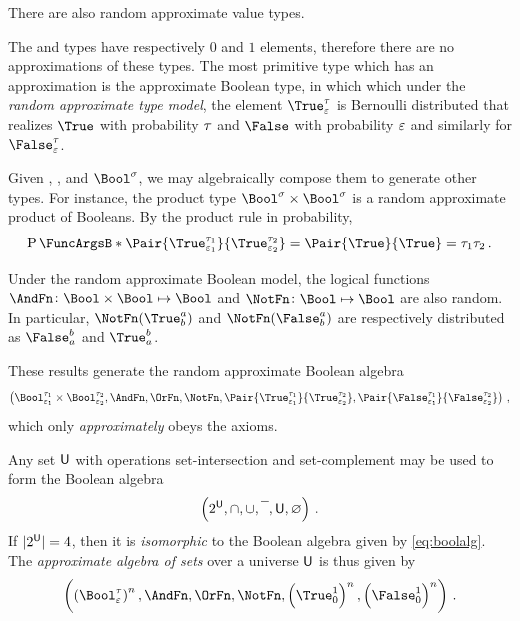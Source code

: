 \documentclass[11pt,final,hidelinks]{article}
\begin{document}
There are also random approximate value types.

The \Void and \Unit types have respectively $0$ and $1$ elements, therefore there are no approximations of these types.
The most primitive type which has an approximation is the approximate Boolean type, in which which under the \emph{random approximate type model}, the element $\True_\fprate^\tprate$ is Bernoulli distributed that realizes $\True$ with probability $\tau$ and $\False$ with probability $\varepsilon$ and similarly for $\False_\fprate^\tprate$.

Given \Void, \Unit, and $\Bool^{\sigma}$, we may algebraically compose them to generate other types.
For instance, the product type $\Bool^{\sigma} \times \Bool^{\sigma}$ is a random approximate product of Booleans.
By the product rule in probability,
\begin{equation}
	\Prob{\Pair{\True_{\fprate_1}^{\tprate_1}}{\True_{\fprate_2}^{\tprate_2}} = \Pair{\True}{\True}} = \tprate_1 \tprate_2\,.
\end{equation}

Under the random approximate Boolean model, the logical functions $\AndFn \colon \Bool \times \Bool \mapsto \Bool$ and $\NotFn \colon \Bool \mapsto \Bool$ are also random.
In particular, $\NotFn(\True_b^a)$ and $\NotFn(\False_b^a)$ are respectively distributed as  $\False_a^b$ and  $\True_a^b$.

These results generate the random approximate Boolean algebra
\begin{equation}
\label{eq:boolalg}
\left(
	\Bool_{\fprate_1}^{\tprate_1} \times \Bool_{\fprate_2}^{\tprate_2},
	\AndFn, \OrFn, \NotFn,
	\Pair{\True_{\fprate_1}^{\tprate_1}}{\True_{\fprate_2}^{\tprate_2}},
	\Pair{\False_{\fprate_1}^{\tprate_1}}{\False_{\fprate_2}^{\tprate_2}}
\right)\,,
\end{equation}
which only \emph{approximately} obeys the axioms.

Any set $\Set{U}$ with operations set-intersection and set-complement may be used to form the Boolean algebra
\begin{equation}
\left(
	\PS{\Set{U}},
	\SetIntersection, \SetUnion, \SetComplement,
	\Set{U},
	\EmptySet
\right)\,.
\end{equation}
If $\Card{\PS{\Set{U}}} = 4$, then it is \emph{isomorphic} to the Boolean algebra given by \cref{eq:boolalg}.
The \emph{approximate algebra of sets} over a universe $\Set{U}$ is thus given by
\begin{equation}
\left(
	\left(\Bool_{\fprate}^{\tprate}\right)^n,
	\AndFn, \OrFn, \NotFn,
	\left(\True_{0}^{1}\right)^n,
	\left(\False_{0}^{1}\right)^n
\right)\,.
\end{equation}
\end{document}
